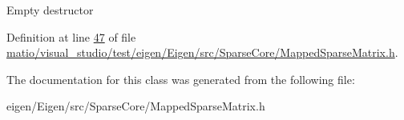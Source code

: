 Empty destructor 

Definition at line \hyperlink{matio_2visual__studio_2test_2eigen_2_eigen_2src_2_sparse_core_2_mapped_sparse_matrix_8h_source_l00047}{47} of file \hyperlink{matio_2visual__studio_2test_2eigen_2_eigen_2src_2_sparse_core_2_mapped_sparse_matrix_8h_source}{matio/visual\+\_\+studio/test/eigen/\+Eigen/src/\+Sparse\+Core/\+Mapped\+Sparse\+Matrix.\+h}.



The documentation for this class was generated from the following file\+:\begin{DoxyCompactItemize}
\item 
eigen/\+Eigen/src/\+Sparse\+Core/\+Mapped\+Sparse\+Matrix.\+h\end{DoxyCompactItemize}
